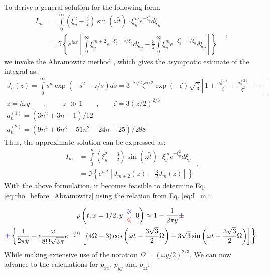 To derive a general solution for the following form,
\begin{equation*}
    \begin{aligned}
        I_m & =\int\limits_{0}^{\infty} \left( \xi_y^2 - \frac{3}{2} \right) \sin\left( \omega \tilde{t} \right) \cdot \xi_y^m e^{-\xi_y^2} d\xi_y & \\
        & =\Im \left\{e^{i\omega t}\left[\int\limits _{0}^{\infty } \xi _{y}^{m+2} e^{-\xi _{y}^{2} -z/\xi _{y}} d\xi _{y} -\frac{3}{2}\int\limits _{0}^{\infty } \xi _{y}^{m} e^{-\xi _{y}^{2} -z/\xi _{y}} d\xi _{y}\right]\right\}
\end{aligned}
,
\end{equation*}
we invoke the Abramowitz method \cite{abramowitz1953evaluation}, which gives the asymptotic estimate of the integral as:
\begin{gather*}
J_{n}( z) =\int\limits _{0}^{\infty } s^{n}\exp\left( -s^{2} -z/s\right) ds=3^{-n/2} \zeta ^{n/2}\exp( -\zeta )\sqrt{\frac{\pi }{3}}\left[ 1+\frac{a_{n}^{( 1)}}{\zeta } +\frac{a_{n}^{( 2)}}{\zeta ^{2}} +\cdots \right]\\
z=i\omega y\quad \quad ,\quad \quad | z| \gg 1\quad \quad ,\quad \quad \zeta =3( z/2)^{2/3}\\
a_{n}^{( 1)} =\left( 3n^{2} +3n-1\right) /12\\
a_{n}^{( 2)} =\left( 9n^{4} +6n^{3} -51n^{2} -24n+25\right) /288
\end{gather*}
Thus, the approximate solution can be expressed as:
\begin{equation}\label{eq:I_m}
\begin{aligned}
    I_m & =\int\limits_0^\infty \left( \xi_y^2 - \frac{3}{2} \right) \sin\left( \omega\tilde{t} \right) \cdot \xi_y^m e^{-\xi_y^2} d\xi_y \\
     & =
     \Im \left\{ e^{i\omega t}\left[ J_{m+2}(z) - \frac{3}{2} J_{m}(z) \right]\right\}
\end{aligned}
.
\end{equation}
With the above formulation, it becomes feasible to determine Eq. \ref{eq:rho_before_Abramowitz} using the relation from Eq. \ref{eq:I_m}:

\begin{multline}
\rho \left( t,x=1/2,y\begin{array}{ c }
\textcolor[rgb]{0,0,1}{\geqslant }\\
\textcolor[rgb]{1,0,0}{\leqslant }
\end{array} 0\right)
\approx
1-\frac{1}{2\pi y} \cpm \\
\cpm \left\{\frac{1}{2\pi y} + \epsilon \frac{\omega }{8\Omega \sqrt{3\pi }} e^{-\frac{3}{2} \Omega }\left[( 4\Omega -3)\cos\left( \omega t-\frac{3\sqrt{3}}{2} \Omega \right) -3\sqrt{3}\sin\left( \omega t-\frac{3\sqrt{3}}{2} \Omega \right)\right]\right\}
\end{multline}
While making extensive use of the notation $\Omega =\left(\omega y/2\right)^{2/3}$. We can now advance to the calculations for $p_{xx}$, $p_{yy}$ and $p_{zz}$:


